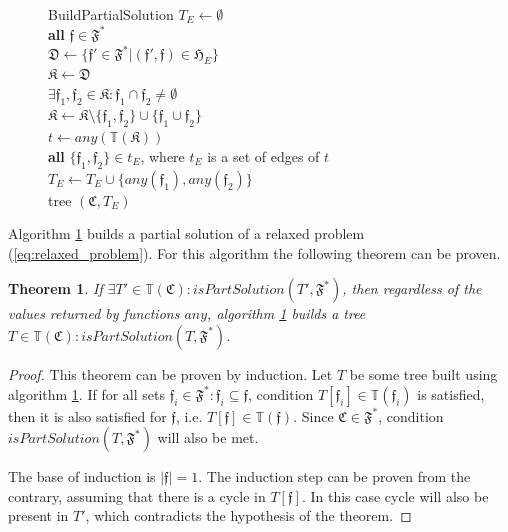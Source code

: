 \documentclass[times, 10pt,twocolumn]{article}
\newcommand{\gC}{\mathfrak{C}}
\newcommand{\gD}{\mathfrak{D}}
\newcommand{\gF}{\mathfrak{F}}
\newcommand{\gH}{\mathfrak{H}}
\newcommand{\gK}{\mathfrak{K}}
\newcommand{\gf}{\mathfrak{f}}
\newcommand{\nT}{\mathbb{T}}
\newcommand{\gFs}{\gF^*}
\newcommand{\any}{\textit{any}}
\newcommand{\isPartSol}{\textit{isPartSolution}}
\newtheorem{theorem}{Theorem}
\begin{document}
\begin{figure}[htb!]
\small
\begin{minipage}[b]{0.5\textwidth}
\begin{algorithm}{BuildPartialSolution}{
    \label{alg:build_tree}
}
$T_E \gets \emptyset$ \\
\qfor \textbf{all} $\gf \in \gFs$ \qdo \\
    $\gD \gets \{\gf' \in \gFs | (\gf', \gf) \in \gH_E\}$ \\
    $\gK \gets \gD$ \\
    \qwhile $\exists \gf_1, \gf_2 \in \gK: \gf_1 \cap \gf_2 \ne \emptyset$ \qdo \\
        $\gK \gets \gK \setminus \{\gf_1, \gf_2\} \cup \{\gf_1 \cup \gf_2\}$
    \qelihw \\
    $t \gets \any(\nT(\gK))$ \\
    \qfor \textbf{all} $\{\gf_1, \gf_2\} \in t_E$, where $t_E$ is a set of edges of $t$ \qdo \\
        $T_E \gets T_E \cup \{\any(\gf_1), \any(\gf_2)\}$
    \qrof
\qrof \\
\qreturn tree $(\gC, T_E)$
\end{algorithm}
\end{minipage}
\end{figure}


Algorithm \ref{alg:build_tree} builds a partial solution
of a relaxed problem (\ref{eq:relaxed_problem}).
For this algorithm the following theorem can be proven.
\begin{theorem}\label{theorem:evil}
If $\exists T' \in \nT(\gC): \isPartSol(T', \gFs)$,
then regardless of the values returned by functions $\any$,
algorithm \ref{alg:build_tree} builds
a tree $T \in \nT(\gC): \isPartSol(T, \gFs)$.
\end{theorem}
\begin{proof}
This theorem can be proven by induction.
Let $T$ be some tree built using algorithm \ref{alg:build_tree}.
If for all sets $\gf_i \in \gFs: \gf_i \subseteq \gf$,
condition $T[\gf_i] \in \nT(\gf_i)$ is satisfied,
then it is also satisfied for $\gf$,
i.e. $T[\gf] \in \nT(\gf)$.
Since $\gC \in \gFs$, condition $\isPartSol(T, \gFs)$ will also be met.

The base of induction is $|\gf| = 1$.
The induction step can be proven from the contrary,
assuming that there is a cycle in $T[\gf]$.
In this case cycle will also be present in $T'$,
which contradicts the hypothesis of the theorem.
\end{proof}
\end{document}
